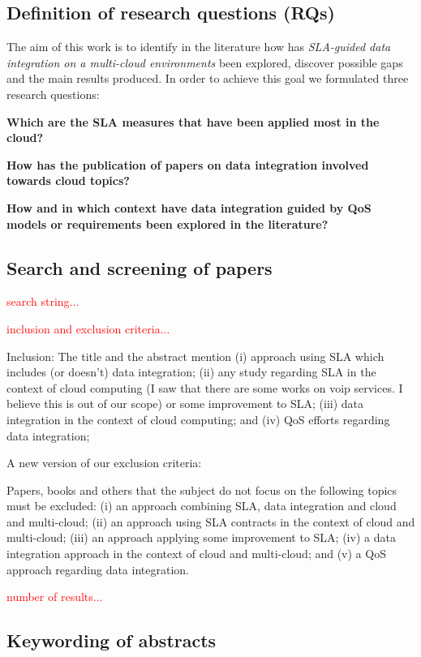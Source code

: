 \documentclass[preprint,12pt]{elsarticle}
\theoremstyle{plain}
\theoremstyle{plain}
\theoremstyle{plain}
\theoremstyle{plain}
\begin{document}
\subsection{Definition of research questions (RQs)}
The aim of this work is to identify in the literature how has \textit{SLA-guided data integration on a multi-cloud environments} been explored, discover possible gaps and the main results produced.
In order to achieve this goal we formulated three research questions:
\begin{description}
\item \textbf{Which are the SLA measures that have been applied most in the cloud?}
\item \textbf{How has the publication of papers on data integration involved towards cloud topics?}
\item \textbf{How and in which context have data integration guided by QoS models or requirements been explored in the literature?}
\end{description}

\subsection{Search and screening of papers}
\textcolor{red}{search string...}

\textcolor{red}{inclusion and exclusion criteria...}

Inclusion: The title and the abstract mention (i) approach using SLA which includes (or doesn't) data integration; (ii) any study regarding SLA in the context of cloud computing (I saw that there are some works on voip services. I believe this is out of our scope) or some improvement to SLA; (iii) data integration in the context of cloud computing; and (iv) QoS efforts regarding data integration;

A new version of our exclusion criteria:

Papers, books and others that the subject do not focus on the following topics must be excluded:
(i) an approach combining SLA, data integration and cloud and multi-cloud;
(ii) an approach using SLA contracts in the context of cloud and multi-cloud;
(iii) an approach applying some improvement to SLA;
(iv) a data integration approach in the context of cloud and multi-cloud; and
(v) a QoS approach regarding data integration.

\textcolor{red}{number  of results...}

\subsection{Keywording of abstracts}
\end{document}
